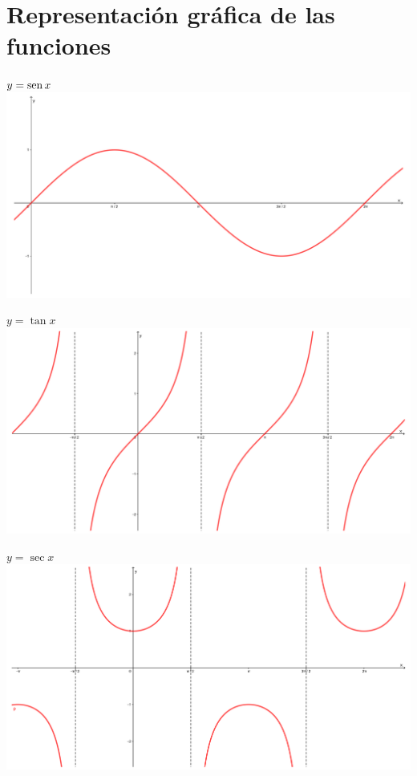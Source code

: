 \section*{Representación gráfica de las funciones}
\begin{minipage}[c]{0.5\textwidth}
\begin{center}
$y=\operatorname{sen} x$\\
\includegraphics[scale=0.1]{Grap/sen}
\end{center}
\begin{center}
$y=\tan x$\\
\includegraphics[scale=0.08]{Grap/tan}
\end{center}
\begin{center}
$y=\sec x$\\
\includegraphics[scale=0.08]{Grap/sec}

\end{center}
\end{minipage}
